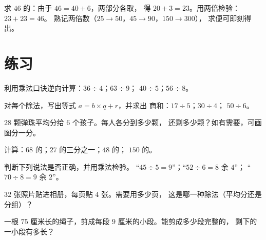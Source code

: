 \begin{example}[倍与一半相伴]\label{ex:g3:division:double}
求 $46$ 的：由于 $46 = 40 + 6$，两部分各取，
得 $20 + 3 = 23$。用两倍检验：$23 + 23 = 46$。
熟记两倍数（$25 \to 50$，$45 \to 90$，$150 \to 300$），
求便可即刻得出。
\end{example}

\section{练习}

\begin{exercise}[$\star$]\label{exo:g3:division:1}
利用乘法口诀逆向计算：$36 \div 4$；\quad $63 \div 9$；
\quad $40 \div 5$；\quad $56 \div 8$。
\end{exercise}

\begin{exercise}[$\star$]\label{exo:g3:division:2}
对每个除法，写出等式 $a = b \times q + r$，并求出
商和：$17 \div 5$；\quad $30 \div 4$；\quad
$50 \div 6$。
\end{exercise}

\begin{exercise}[$\star$]\label{exo:g3:division:3}
$28$ 颗弹珠平均分给 $6$ 个孩子。每人各分到多少颗，
还剩多少颗？如有需要，可画图分一分。
\end{exercise}

\begin{exercise}[$\star$]\label{exo:g3:division:4}
计算：$68$ 的；$27$ 的三分之一；$48$ 的；
$150$ 的。
\end{exercise}

\begin{exercise}[$\star$]\label{exo:g3:division:5}
判断下列说法是否正确，并用乘法检验。
“$45 \div 5 = 9$”；\quad “$52 \div 6 = 8$ 余 $4$”；
\quad “$70 \div 8 = 9$ 余 $2$”。
\end{exercise}

\begin{exercise}[$\star$]\label{exo:g3:division:6}
$32$ 张照片贴进相册，每页贴 $4$ 张。需要用多少页，
这是哪一种除法（平均分还是分组）？
\end{exercise}

\begin{exercise}[$\star$]\label{exo:g3:division:7}
一根 $75$ 厘米长的绳子，剪成每段 $9$ 厘米的小段。能剪成多少段完整的，
剩下的一小段有多长？
\end{exercise}

